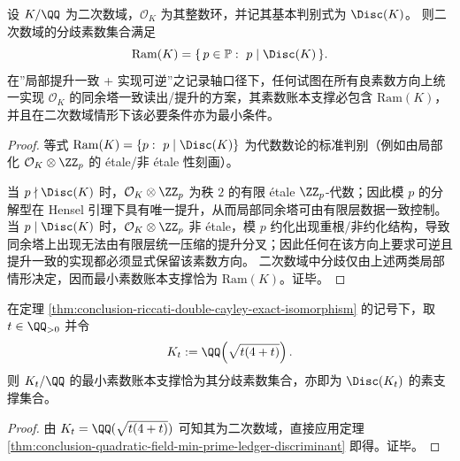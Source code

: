 \begin{theorem}[二次数域的分歧素数与最小素数账本]\label{thm:conclusion-quadratic-field-min-prime-ledger-discriminant}
设 \(K/\QQ\) 为二次数域，\(\mathcal O_K\) 为其整数环，并记其基本判别式为 \(\Disc(K)\)。
则二次数域的分歧素数集合满足
\[
\mathrm{Ram}(K)=\{\,p\in\mathbb P:\ p\mid \Disc(K)\,\}.
\]
在”局部提升一致 + 实现可逆”之记录轴口径下，任何试图在所有良素数方向上统一实现 \(\mathcal O_K\) 的同余塔一致读出/提升的方案，其素数账本支撑必包含 \(\mathrm{Ram}(K)\)，并且在二次数域情形下该必要条件亦为最小条件。
\end{theorem}
\begin{proof}
等式 \(\mathrm{Ram}(K)=\{p:\ p\mid \Disc(K)\}\) 为代数数论的标准判别（例如由局部化 \(\mathcal O_K\otimes\ZZ_p\) 的 \'etale/非 \'etale 性刻画）。
\par
当 \(p\nmid \Disc(K)\) 时，\(\mathcal O_K\otimes\ZZ_p\) 为秩 \(2\) 的有限 \'etale \(\ZZ_p\)-代数；因此模 \(p\) 的分解型在 Hensel 引理下具有唯一提升，从而局部同余塔可由有限层数据一致控制。
当 \(p\mid \Disc(K)\) 时，\(\mathcal O_K\otimes\ZZ_p\) 非 \'etale，模 \(p\) 约化出现重根/非约化结构，导致同余塔上出现无法由有限层统一压缩的提升分叉；因此任何在该方向上要求可逆且提升一致的实现都必须显式保留该素数方向。
二次数域中分歧仅由上述两类局部情形决定，因而最小素数账本支撑恰为 \(\mathrm{Ram}(K)\)。证毕。
\end{proof}


\begin{corollary}\label{cor:conclusion-riccati-quadratic-field-ramification-ledger}
在定理 \ref{thm:conclusion-riccati-double-cayley-exact-isomorphism} 的记号下，取 \(t\in\QQ_{>0}\) 并令
\[
K_t:=\QQ\!\left(\sqrt{t(4+t)}\right).
\]
则 \(K_t/\QQ\) 的最小素数账本支撑恰为其分歧素数集合，亦即为 \(\Disc(K_t)\) 的素支撑集合。
\end{corollary}
\begin{proof}
由 \(K_t=\QQ(\sqrt{t(4+t)})\) 可知其为二次数域，直接应用定理 \ref{thm:conclusion-quadratic-field-min-prime-ledger-discriminant} 即得。证毕。
\end{proof}

